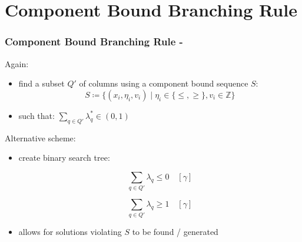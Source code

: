 \documentclass[compress,beamer,aspectratio=169,english,usenames,dvipsnames]{beamer}
\begin{document}
\section{Component Bound Branching Rule}

\begin{frame}
\frametitle{Component Bound Branching Rule - \cite{thebook}}
Again:
\begin{itemize}
\item	find a subset $Q'$ of columns using a component bound sequence $S$:
		\begin{equation*}
		S \coloneqq \{ \left( x_i, \eta_i, v_i \right) \mid \eta_i \in \{\leq, \geq\}, v_i \in \mathbb{Z} \}
		\end{equation*}
\item	such that: \quad $\sum_{q \in Q'} \lambda_q^* \in \left(0, 1\right)$
\end{itemize}

\pause

Alternative scheme:
\begin{itemize}
\item	create binary search tree:
		\begin{multicols}{2}
		\noindent
		\begin{minipage}{\linewidth}
		\setlength{\belowdisplayskip}{0pt} \setlength{\belowdisplayshortskip}{0pt}
		\setlength{\abovedisplayskip}{0pt} \setlength{\abovedisplayshortskip}{0pt}
		\begin{equation*}
		\sum_{q \in Q'} \lambda_q \leq 0 \quad \left[\gamma\right]
		\end{equation*}
		\end{minipage}

		\columnbreak

		\noindent
		\begin{minipage}{\linewidth}
		\setlength{\belowdisplayskip}{0pt} \setlength{\belowdisplayshortskip}{0pt}
		\setlength{\abovedisplayskip}{0pt} \setlength{\abovedisplayshortskip}{0pt}
		\begin{equation}
		\sum_{q \in Q'} \lambda_q \geq 1 \quad \left[\gamma\right]
		\end{equation}
		\end{minipage}
		\end{multicols}
\pause
\item	allows for solutions violating $S$ to be found / generated
\end{itemize}
\end{frame}
\end{document}
